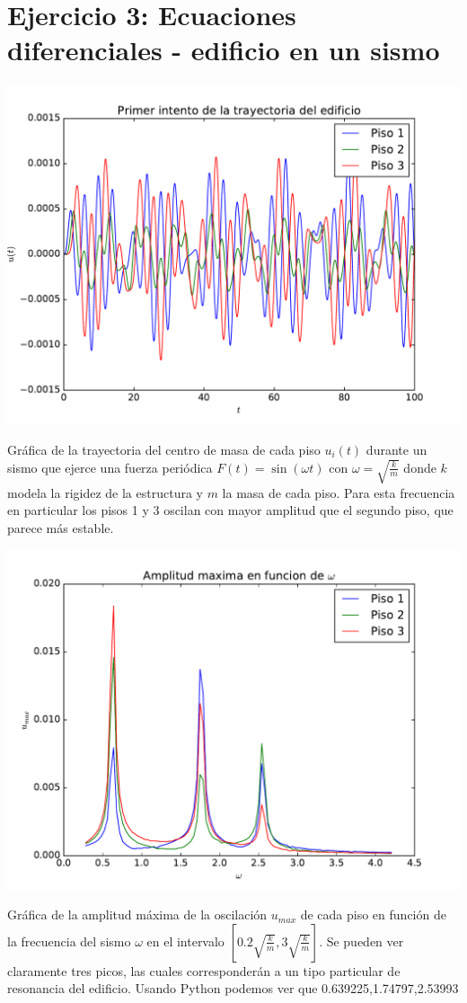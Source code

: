 \documentclass[11pt,letterpaper]{exam}
\begin{document}
\section{Ejercicio 3: Ecuaciones diferenciales - edificio en un sismo}
\begin{center}
\includegraphics[width=14cm]{3_PrimerEdificio.pdf}
\end{center}
Gráfica de la trayectoria del centro de masa de cada piso $u_i(t)$ durante un sismo que ejerce una fuerza periódica $F(t)=\sin(\omega t)$ con $\omega=\sqrt{\frac{k}{m}}$ donde $k$ modela la rigidez de la estructura y $m$ la masa de cada piso. Para esta frecuencia en particular los pisos 1 y 3 oscilan con mayor amplitud que el segundo piso, que parece más estable.
\begin{center}
\includegraphics[width=14cm]{3_Maximos.pdf}
\end{center}
Gráfica de la amplitud máxima de la oscilación $u_{max}$ de cada piso en función de la frecuencia del sismo $\omega$ en el intervalo $\left[0.2\sqrt{\frac{k}{m}},3\sqrt{\frac{k}{m}} \right]$. Se pueden ver claramente tres picos, las cuales corresponderán a un tipo particular de resonancia del edificio. Usando Python podemos ver que 0.639225,1.74797,2.53993
\end{document}
